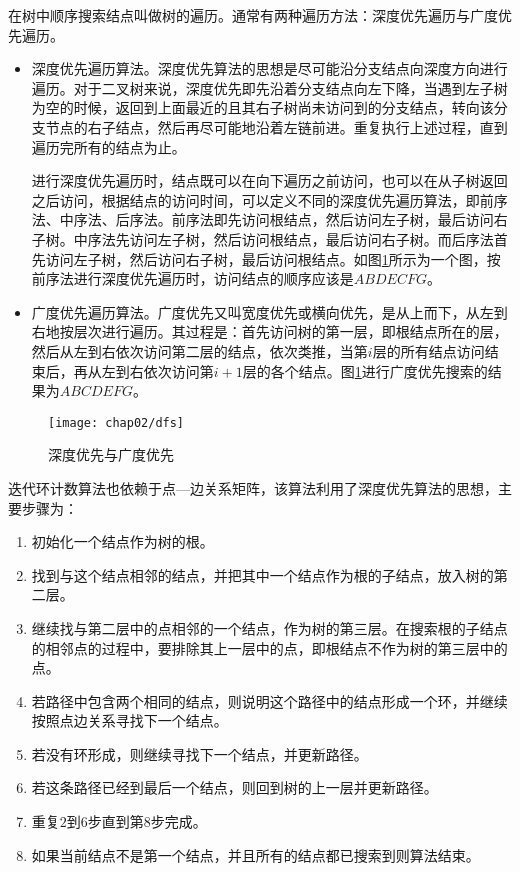 在树中顺序搜索结点叫做树的遍历。通常有两种遍历方法：深度优先遍历与广度优先遍历。
\begin{itemize}

\item 深度优先遍历算法。深度优先算法的思想是尽可能沿分支结点向深度方向进行遍历。对于二叉树来说，深度优先即先沿着分支结点向左下降，当遇到左子树为空的时候，返回到上面最近的且其右子树尚未访问到的分支结点，转向该分支节点的右子结点，然后再尽可能地沿着左链前进。重复执行上述过程，直到遍历完所有的结点为止。

进行深度优先遍历时，结点既可以在向下遍历之前访问，也可以在从子树返回之后访问，根据结点的访问时间，可以定义不同的深度优先遍历算法，即前序法、中序法、后序法。前序法即先访问根结点，然后访问左子树，最后访问右子树。中序法先访问左子树，然后访问根结点，最后访问右子树。而后序法首先访问左子树，然后访问右子树，最后访问根结点。如图\ref{fig:dfs}所示为一个图，按前序法进行深度优先遍历时，访问结点的顺序应该是$ABDECFG$。

\item 广度优先遍历算法。广度优先又叫宽度优先或横向优先，是从上而下，从左到右地按层次进行遍历。其过程是：首先访问树的第一层，即根结点所在的层，然后从左到右依次访问第二层的结点，依次类推，当第$i$层的所有结点访问结束后，再从左到右依次访问第$i+1$层的各个结点。图\ref{fig:dfs}进行广度优先搜索的结果为$ABCDEFG$。

\end{itemize}

\begin{figure}[H]
\centering
\texttt{[image: chap02/dfs]}
\caption{深度优先与广度优先}
\label{fig:dfs}
\end{figure}

迭代环计数算法也依赖于点---边关系矩阵，该算法利用了深度优先算法的思想，主要步骤为：
\begin{enumerate}
\item 初始化一个结点作为树的根。
\item 找到与这个结点相邻的结点，并把其中一个结点作为根的子结点，放入树的第二层。
\item 继续找与第二层中的点相邻的一个结点，作为树的第三层。在搜索根的子结点的相邻点的过程中，要排除其上一层中的点，即根结点不作为树的第三层中的点。
\item 若路径中包含两个相同的结点，则说明这个路径中的结点形成一个环，并继续按照点边关系寻找下一个结点。
\item 若没有环形成，则继续寻找下一个结点，并更新路径。
\item 若这条路径已经到最后一个结点，则回到树的上一层并更新路径。
\item 重复$2$到$6$步直到第$8$步完成。
\item 如果当前结点不是第一个结点，并且所有的结点都已搜索到则算法结束。
\end{enumerate}

